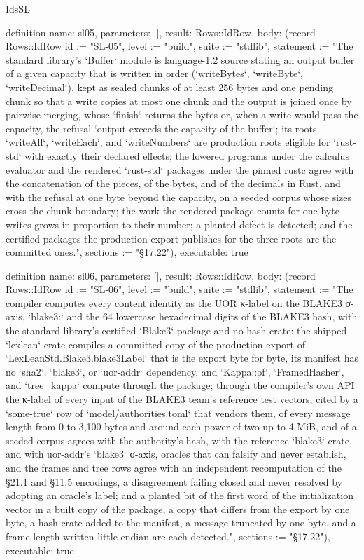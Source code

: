 \begin{lexlean}{IdsSL}
\begin{semanticmodule}
definition{
  name: sl05,
  parameters: [],
  result: Rows::IdRow,
  body: (record Rows::IdRow {id := "SL-05", level := "build", suite := "stdlib", statement := "The standard library's `Buffer` module is language-1.2 source stating an output buffer of a given capacity that is written in order (`writeBytes`, `writeByte`, `writeDecimal`), kept as sealed chunks of at least 256 bytes and one pending chunk so that a write copies at most one chunk and the output is joined once by pairwise merging, whose `finish` returns the bytes or, when a write would pass the capacity, the refusal `output exceeds the capacity of the buffer`; its roots `writeAll`, `writeEach`, and `writeNumbers` are production roots eligible for `rust-std` with exactly their declared effects; the lowered programs under the calculus evaluator and the rendered `rust-std` packages under the pinned rustc agree with the concatenation of the pieces, of the bytes, and of the decimals in Rust, and with the refusal at one byte beyond the capacity, on a seeded corpus whose sizes cross the chunk boundary; the work the rendered package counts for one-byte writes grows in proportion to their number; a planted defect is detected; and the certified packages the production export publishes for the three roots are the committed ones.", sections := "§17.22"}),
  executable: true
}

definition{
  name: sl06,
  parameters: [],
  result: Rows::IdRow,
  body: (record Rows::IdRow {id := "SL-06", level := "build", suite := "stdlib", statement := "The compiler computes every content identity as the UOR κ-label on the BLAKE3 σ-axis, `blake3:` and the 64 lowercase hexadecimal digits of the BLAKE3 hash, with the standard library's certified `Blake3` package and no hash crate: the shipped `lexlean` crate compiles a committed copy of the production export of `LexLeanStd.Blake3.blake3Label` that is the export byte for byte, its manifest has no `sha2`, `blake3`, or `uor-addr` dependency, and `Kappa::of`, `FramedHasher`, and `tree_kappa` compute through the package; through the compiler's own API the κ-label of every input of the BLAKE3 team's reference test vectors, cited by a `some-true` row of `model/authorities.toml` that vendors them, of every message length from 0 to 3,100 bytes and around each power of two up to 4 MiB, and of a seeded corpus agrees with the authority's hash, with the reference `blake3` crate, and with uor-addr's `blake3` σ-axis, oracles that can falsify and never establish, and the frames and tree rows agree with an independent recomputation of the §21.1 and §11.5 encodings, a disagreement failing closed and never resolved by adopting an oracle's label; and a planted bit of the first word of the initialization vector in a built copy of the package, a copy that differs from the export by one byte, a hash crate added to the manifest, a message truncated by one byte, and a frame length written little-endian are each detected.", sections := "§17.22"}),
  executable: true
}


\end{semanticmodule}
\end{lexlean}
